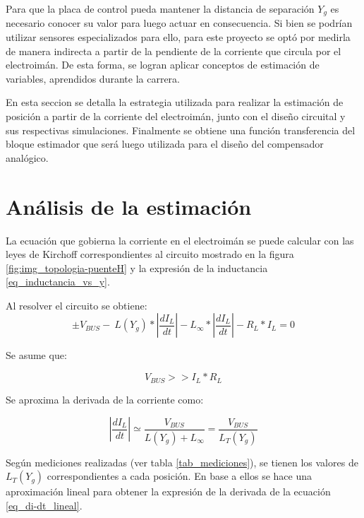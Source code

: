 Para que la placa de control pueda mantener la distancia de separación $Y_{g}$ es necesario conocer su valor  para luego actuar en consecuencia. Si bien se podrían utilizar sensores  especializados para ello, para este proyecto se optó por medirla de manera indirecta a partir de la pendiente de la corriente que circula por el electroimán. De esta forma, se logran aplicar conceptos de estimación de variables, aprendidos durante la carrera. 
 
En esta seccion se detalla la estrategia utilizada para realizar la estimación de posición a partir de la corriente del electroimán, junto con el diseño circuital y sus respectivas simulaciones. Finalmente se obtiene una función transferencia del bloque estimador que será luego utilizada para el diseño del compensador analógico.

\section{An\'{a}lisis de la estimaci\'{o}n}

La ecuaci\'{o}n que gobierna la corriente en el electroim\'{a}n se puede calcular con las leyes de Kirchoff correspondientes al circuito mostrado en la figura \ref{fig:img_topologia-puenteH} y la expresión de la inductancia \ref{eq_inductancia_vs_y}.


Al resolver el circuito se obtiene:
\begin{equation} \label{eq_VbusCondicion}
	\pm V_{BUS}-\ L(Y_g)*\left|\frac{{dI}_L}{dt}\right|-L_{\infty }*\left|\frac{{dI}_L}{dt}\right|-R_L*I_L=0
\end{equation}

Se asume que:

\begin{equation} \label{eq_Derivadadi-dt}
	V_{BUS}>>I_L*R_L
\end{equation}
 
\noindent Se aproxima la derivada de la corriente como:

\begin{equation} \label{eq_derivadaAproximacion}
	\left|\frac{{dI}_L}{dt}\right|\simeq \frac{V_{BUS}}{L(Y_g)+L_{\infty }}=\frac{V_{BUS}}{L_T(Y_g)}
\end{equation}

Según mediciones realizadas (ver tabla \ref{tab_mediciones}), se tienen los valores de $L_T(Y_g)$ correspondientes a cada posici\'{o}n. En base a ellos se hace una aproximaci\'{o}n lineal para obtener la expresi\'{o}n de la derivada de la ecuaci\'{o}n \ref{eq_di-dt_lineal}.


